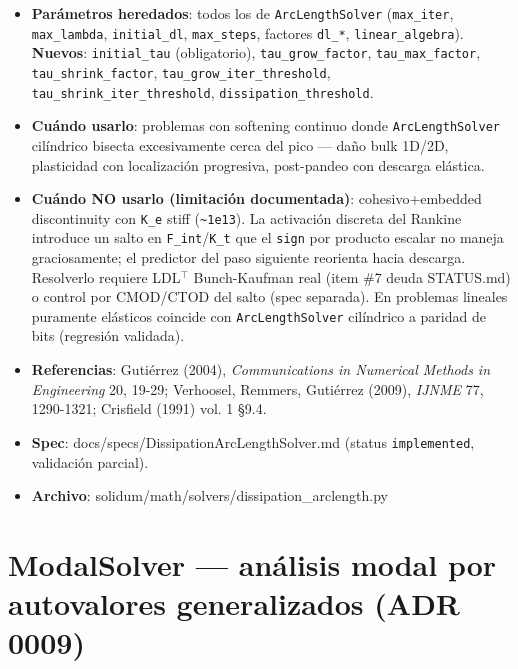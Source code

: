 \documentclass[11pt,letterpaper,oneside]{report}
\begin{document}
\begin{itemize}
  \item \textbf{Parámetros heredados}: todos los de \texttt{ArcLengthSolver} (\texttt{max\_iter}, \texttt{max\_lambda}, \texttt{initial\_dl}, \texttt{max\_steps}, factores \texttt{dl\_*}, \texttt{linear\_algebra}). \textbf{Nuevos}: \texttt{initial\_tau} (obligatorio), \texttt{tau\_grow\_factor}, \texttt{tau\_max\_factor}, \texttt{tau\_shrink\_factor}, \texttt{tau\_grow\_iter\_threshold}, \texttt{tau\_shrink\_iter\_threshold}, \texttt{dissipation\_threshold}.
  \item \textbf{Cuándo usarlo}: problemas con softening continuo donde \texttt{ArcLengthSolver} cilíndrico bisecta excesivamente cerca del pico --- daño bulk 1D/2D, plasticidad con localización progresiva, post-pandeo con descarga elástica.
  \item \textbf{Cuándo NO usarlo (limitación documentada)}: cohesivo+embedded discontinuity con \texttt{K\_e} stiff (\texttt{\textasciitilde{}1e13}). La activación discreta del Rankine introduce un salto en \texttt{F\_int}/\texttt{K\_t} que el \texttt{sign} por producto escalar no maneja graciosamente; el predictor del paso siguiente reorienta hacia descarga. Resolverlo requiere LDL\ensuremath{^{\top}} Bunch-Kaufman real (item \#7 deuda STATUS.md) o control por CMOD/CTOD del salto (spec separada). En problemas lineales puramente elásticos coincide con \texttt{ArcLengthSolver} cilíndrico a paridad de bits (regresión validada).
  \item \textbf{Referencias}: Gutiérrez (2004), \textit{Communications in Numerical Methods in Engineering} 20, 19-29; Verhoosel, Remmers, Gutiérrez (2009), \textit{IJNME} 77, 1290-1321; Crisfield (1991) vol. 1 §9.4.
  \item \textbf{Spec}: docs/specs/DissipationArcLengthSolver.md (status \texttt{implemented}, validación parcial).
  \item \textbf{Archivo}: solidum/math/solvers/dissipation\_arclength.py
\end{itemize}


\section{ModalSolver --- análisis modal por autovalores generalizados (ADR 0009)}
\end{document}
